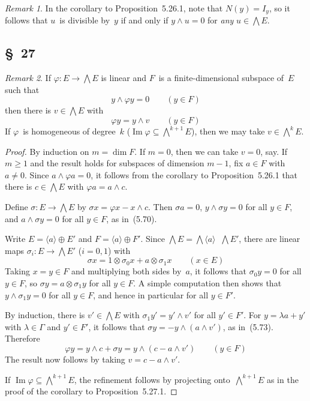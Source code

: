 \documentclass[letterpaper,12pt]{article}
\DeclareMathOperator{\im}{Im}
\newcommand{\dsum}{\oplus}
\newcommand{\tprod}{\otimes}
\newcommand{\stprod}{\mathop{\widehat{\otimes}}}
\newcommand{\eprod}{\wedge}
\newcommand{\bigeprod}{\bigwedge}
\newcommand{\medeprod}{{\textstyle\bigeprod}}
\newcommand{\gen}[1]{\langle#1\rangle}
\theoremstyle{definition}
\theoremstyle{remark}
\newtheorem*{rmk}{Remark}
\begin{document}
\begin{rmk}
In the corollary to Proposition~5.26.1, note that \(N(y)=I_y\), so it follows that \(u\)~is divisible by~\(y\) if and only if \(y\eprod u=0\) for \emph{any} \(u\in\medeprod E\).
\end{rmk}

\subsection*{\S~27}
\begin{rmk}
If \(\varphi:E\to\medeprod E\) is linear and \(F\)~is a finite-dimensional subspace of~\(E\) such that
\[y\eprod\varphi y=0\qquad(y\in F)\]
then there is \(v\in\medeprod E\) with
\[\varphi y=y\eprod v\qquad(y\in F)\]
If \(\varphi\)~is homogeneous of degree~\(k\) (\(\im\varphi\subseteq\medeprod^{k+1}E\)), then we may take \(v\in\medeprod^k E\).
\end{rmk}
\begin{proof}
By induction on \(m=\dim F\). If \(m=0\), then we can take \(v=0\), say. If \(m\ge 1\) and the result holds for subspaces of dimension \(m-1\), fix \(a\in F\) with \(a\ne 0\). Since \(a\eprod\varphi a=0\), it follows from the corollary to Proposition~5.26.1 that there is \(c\in\medeprod E\) with \(\varphi a=a\eprod c\).

Define \(\sigma:E\to\medeprod E\) by \(\sigma x=\varphi x-x\eprod c\). Then \(\sigma a=0\), \(y\eprod\sigma y=0\) for all \(y\in F\), and \(a\eprod\sigma y=0\) for all \(y\in F\), as in~(5.70).

Write \(E=\gen{a}\dsum E'\) and \(F=\gen{a}\dsum F'\). Since \(\medeprod E=\medeprod\gen{a}\stprod\medeprod E'\), there are linear maps \(\sigma_i:E\to\medeprod E'\) (\(i=0,1\)) with
\[\sigma x=1\tprod\sigma_0 x+a\tprod\sigma_1 x\qquad(x\in E)\]
Taking \(x=y\in F\) and multiplying both sides by~\(a\), it follows that \(\sigma_0 y=0\) for all \(y\in F\), so \(\sigma y=a\tprod\sigma_1 y\) for all \(y\in F\). A simple computation then shows that \(y\eprod\sigma_1 y=0\) for all \(y\in F\), and hence in particular for all \(y\in F'\).

By induction, there is \(v'\in\medeprod E\) with \(\sigma_1 y'=y'\eprod v'\) for all \(y'\in F'\). For \(y=\lambda a+y'\) with \(\lambda\in\Gamma\) and \(y'\in F'\), it follows that \(\sigma y=-y\eprod(a\eprod v')\), as in~(5.73). Therefore
\[\varphi y=y\eprod c+\sigma y=y\eprod(c-a\eprod v')\qquad(y\in F)\]
The result now follows by taking \(v=c-a\eprod v'\).

If \(\im\varphi\subseteq\medeprod^{k+1} E\), the refinement follows by projecting onto~\(\medeprod^{k+1}E\) as in the proof of the corollary to Proposition~5.27.1.
\end{proof}
\end{document}
